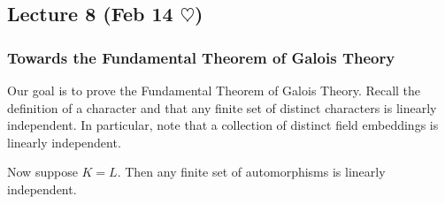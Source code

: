 \documentclass[10pt, twoside]{article}
\begin{document}
    \subsection{Lecture 8 (Feb 14 $\heartsuit$)}
    \subsubsection{Towards the Fundamental Theorem of Galois Theory}

    Our goal is to prove the Fundamental Theorem of Galois Theory. Recall the definition of a character and that any finite set of distinct characters is linearly independent. In particular, note that a collection of distinct field embeddings is linearly independent.

    Now suppose $K = L$. Then any finite set of automorphisms is linearly independent.
\end{document}
